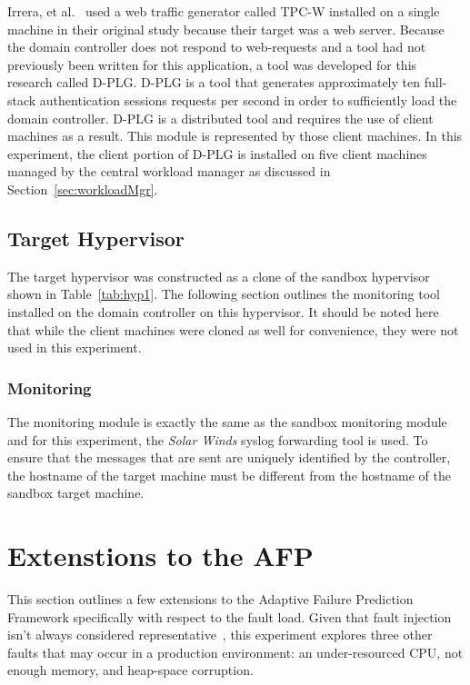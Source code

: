 Irrera, et al.~\cite{irrera2015} used a web traffic generator called TPC-W
installed on a single machine in their original study because their target was
a web server.  Because the domain controller does not respond to web-requests
and a tool had not previously been written for this application, a tool was
developed for this research called D-PLG. D-PLG is a tool that generates
approximately ten full-stack authentication sessions requests per second in
order to sufficiently load the domain controller.  D-PLG is a distributed tool
and requires the use of client machines as a result.  This module is
represented by those client machines.  In this experiment, the client portion
of D-PLG is installed on five client machines managed by the central workload
manager as discussed in Section~\ref{sec:workloadMgr}.

\subsection{Target Hypervisor} \label{sec:target}
The target hypervisor was constructed as a clone of the sandbox hypervisor
shown in Table~\ref{tab:hyp1}.  The following section outlines the monitoring
tool installed on the domain controller on this hypervisor.  It should be noted
here that while the client machines were cloned as well for convenience, they
were not used in this experiment.

\subsubsection{Monitoring} \label{sec:targetMonitoringTool}
The monitoring module is exactly the same as the sandbox monitoring module and
for this experiment, the \emph{Solar Winds} syslog forwarding tool is used.  To
ensure that the messages that are sent are uniquely identified by the
controller, the hostname of the target machine must be different from the
hostname of the sandbox target machine.

\setcounter{secnumdepth}{3}

\section{Extenstions to the AFP} \label{sec:extensions}
This section outlines a few extensions to the Adaptive Failure Prediction
Framework specifically with respect to the fault load.  Given that fault
injection isn't always considered representative~\cite{kikuchi2014}, this
experiment explores three other faults that may occur in a production
environment:  an under-resourced CPU, not enough memory, and heap-space
corruption.


